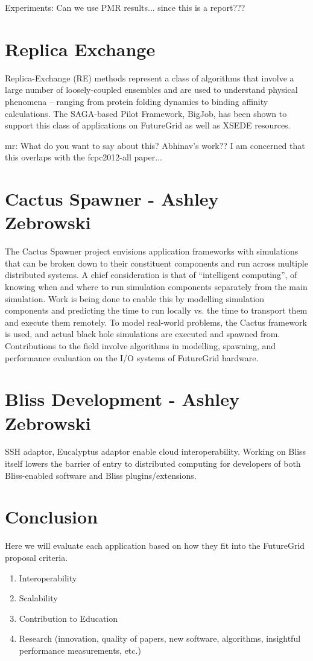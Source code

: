 \documentclass[]{paper}
\begin{document}
Experiments:
  Can we use PMR results... since this is a report???



\section{Replica Exchange}

Replica-Exchange (RE) methods represent a class of algorithms that involve a large number of loosely-coupled ensembles 
and are used to understand physical phenomena – ranging from protein folding dynamics to binding affinity calculations. The SAGA-based Pilot Framework, BigJob, has been shown to support this class of applications on FutureGrid as well as XSEDE resources.

mr: What do you want to say about this? Abhinav's work?? I am concerned that this overlaps with the fcpc2012-all paper...



\section{Cactus Spawner - Ashley Zebrowski}
The Cactus Spawner project envisions application frameworks with simulations that
can be broken down to their constituent components and run across multiple
distributed systems.  A chief consideration is that of ``intelligent computing'',
of knowing when and where to run simulation components separately from the main
simulation.  Work is being done to enable this by modelling simulation components
and predicting the time to run locally vs. the time to transport them and execute
them remotely.  To model real-world problems, the Cactus framework is used, and
actual black hole simulations are executed and spawned from.  Contributions
to the field involve algorithms in modelling, spawning, and performance evaluation on
the I/O systems of FutureGrid hardware.

\section{Bliss Development - Ashley Zebrowski}
SSH adaptor, Eucalyptus adaptor enable cloud interoperability.  Working on 
Bliss itself lowers the barrier of entry to distributed computing for developers
of both Bliss-enabled software and Bliss plugins/extensions.

\section{Conclusion}
Here we will evaluate each application based on how they fit into the FutureGrid proposal
criteria.
\begin{enumerate}
\item Interoperability
\item Scalability
\item Contribution to Education
\item Research (innovation, quality of papers, new software, algorithms, insightful performance measurements, etc.)

\end{enumerate}
\begin{thebibliography}{9}
\end{thebibliography}
\end{document}
